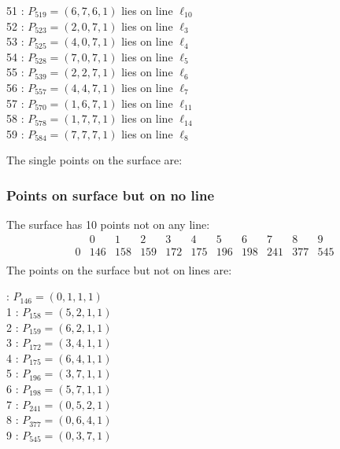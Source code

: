 \documentclass{article}
\begin{document}
{\begin{multicols}{2}
51 : $P_{519}=( 6, 7, 6, 1 )$ lies on line $\ell_{10}$\\
52 : $P_{523}=( 2, 0, 7, 1 )$ lies on line $\ell_{3}$\\
53 : $P_{525}=( 4, 0, 7, 1 )$ lies on line $\ell_{4}$\\
54 : $P_{528}=( 7, 0, 7, 1 )$ lies on line $\ell_{5}$\\
55 : $P_{539}=( 2, 2, 7, 1 )$ lies on line $\ell_{6}$\\
56 : $P_{557}=( 4, 4, 7, 1 )$ lies on line $\ell_{7}$\\
57 : $P_{570}=( 1, 6, 7, 1 )$ lies on line $\ell_{11}$\\
58 : $P_{578}=( 1, 7, 7, 1 )$ lies on line $\ell_{14}$\\
59 : $P_{584}=( 7, 7, 7, 1 )$ lies on line $\ell_{8}$\\
\end{multicols}
The single points on the surface are:\\
\subsubsection*{Points on surface but on no line}
The surface has 10 points not on any line:\\
$$
\begin{array}{r|*{10}{r}}
 & 0 & 1 & 2 & 3 & 4 & 5 & 6 & 7 & 8 & 9\\
\hline
0 & 146 & 158 & 159 & 172 & 175 & 196 & 198 & 241 & 377 & 545\\
\end{array}
$$
The points on the surface but not on lines are:\\
\begin{multicols}{2}
 : $P_{146}=( 0, 1, 1, 1 )$\\
1 : $P_{158}=( 5, 2, 1, 1 )$\\
2 : $P_{159}=( 6, 2, 1, 1 )$\\
3 : $P_{172}=( 3, 4, 1, 1 )$\\
4 : $P_{175}=( 6, 4, 1, 1 )$\\
5 : $P_{196}=( 3, 7, 1, 1 )$\\
6 : $P_{198}=( 5, 7, 1, 1 )$\\
7 : $P_{241}=( 0, 5, 2, 1 )$\\
8 : $P_{377}=( 0, 6, 4, 1 )$\\
9 : $P_{545}=( 0, 3, 7, 1 )$\\
\end{multicols}
}
\end{document}
